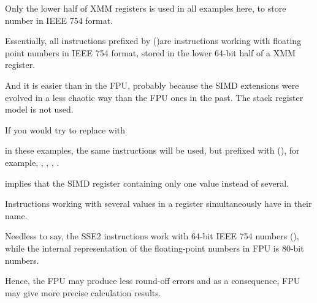 Only the lower half of XMM registers is used in all examples here, 
to store number in IEEE 754 format.

Essentially, all instructions prefixed by 
 ()\EMDASH{}are instructions working with floating point numbers
in IEEE 754 format, stored in the lower 64-bit half of a XMM register.

And it is easier than in the FPU, probably because the SIMD extensions 
were evolved in a less chaotic way than the FPU ones in the past.
The stack register model is not used.

If you would try to replace \Tdouble with \Tfloat

in these examples, the same instructions will be used, but prefixed with  
(), for example, , , , \etc{}.

implies that the SIMD register containing only one value instead of several.

Instructions working with several values in a register simultaneously have  in their name.

Needless to say, the SSE2 instructions work with 64-bit IEEE 754 numbers (\Tdouble),
while the internal representation of the floating-point numbers in FPU is 80-bit numbers.

Hence, the FPU may produce less round-off errors and as a consequence, FPU may give more precise
calculation results.

